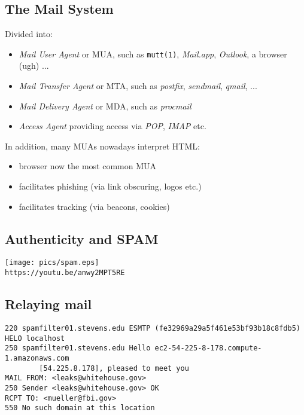 \documentclass[xga]{xdvislides}
\begin{document}
\subsection{The Mail System}
Divided into:
\begin{itemize}
	\item {\em Mail User Agent} or MUA, such as {\tt mutt(1)}, {\em Mail.app}, {\em Outlook}, a browser (ugh) ...
	\item {\em Mail Transfer Agent} or MTA, such as {\em postfix},
		{\em sendmail}, {\em qmail}, ...
	\item {\em Mail Delivery Agent} or MDA, such as {\em procmail}
	\item {\em Access Agent} providing access via {\em POP}, {\em IMAP} etc.
\end{itemize}
\vspace{.5in}
In addition, many MUAs nowadays interpret HTML:
\begin{itemize}
	\item browser now the most common MUA
	\item facilitates phishing (via link obscuring, logos etc.)
	\item facilitates tracking (via beacons, cookies)
\end{itemize}

\subsection{Authenticity and SPAM}
\vspace*{\fill}
\begin{center}
	\texttt{[image: pics/spam.eps]} \\
	{\tt https://youtu.be/anwy2MPT5RE}
\end{center}
\vspace*{\fill}

\subsection{Relaying mail}
\begin{verbatim}
220 spamfilter01.stevens.edu ESMTP (fe32969a29a5f461e53bf93b18c8fdb5)
HELO localhost
250 spamfilter01.stevens.edu Hello ec2-54-225-8-178.compute-1.amazonaws.com
        [54.225.8.178], pleased to meet you
MAIL FROM: <leaks@whitehouse.gov>
250 Sender <leaks@whitehouse.gov> OK
RCPT TO: <mueller@fbi.gov>
550 No such domain at this location
\end{verbatim}
\end{document}
